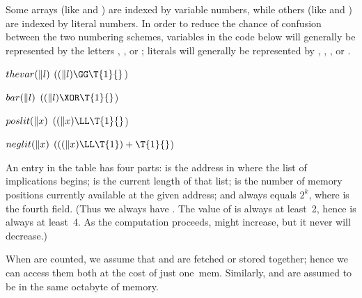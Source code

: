 Some arrays (like  and ) are indexed by variable
numbers,
while others (like  and ) are indexed by literal
numbers. In order
to reduce the chance of confusion between the two numbering schemes,
variables in the code below will generally be represented by the letters ,
, or ; literals will generally be represented by , , , or .

\Y\B\4\D$\\{thevar}(\|l)$ \5
$((\|l)\GG\T{1}{}$)\par
\B\4\D$\\{bar}(\|l)$ \5
$((\|l)\XOR\T{1}{}$)\par
\B\4\D$\\{poslit}(\|x)$ \5
$((\|x)\LL\T{1}{}$)\par
\B\4\D$\\{neglit}(\|x)$ \5
$(((\|x)\LL\T{1})+\T{1}{}$)\par
\fi

An entry in the  table has four parts:  is the address in 
where the list of implications begins;  is the current length of
that list;  is the number of memory positions currently available
at the given address; and  always equals $2^k$, where  is
the fourth field. (Thus we always have . The value of
 is
always at least~2, hence  is always at least~4. As the
computation
proceeds,  might increase, but it never will decrease.)

When  are counted, we assume that  and 
are fetched or
stored together; hence we can access them both at the cost of just one~mem.
Similarly,  and  are assumed to be in the same octabyte
of memory.

